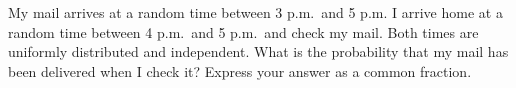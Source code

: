 My mail arrives at a random time between 3 p.m.\ and 5 p.m. I arrive home at a random time between 4 p.m.\ and 5 p.m.\ and check my mail. Both times are uniformly distributed and independent. What is the probability that my mail has been delivered when I check it? Express your answer as a common fraction.
